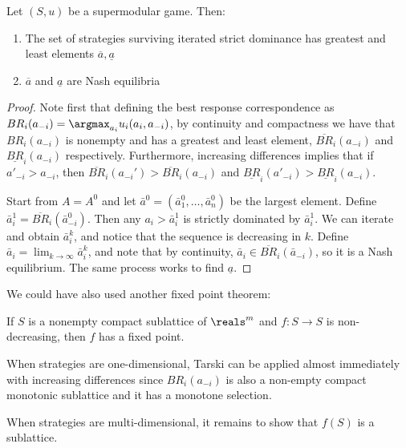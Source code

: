 \documentclass[10pt]{article}
\begin{document}
\begin{theorem}
	Let $(S,u)$ be a supermodular game. Then:\begin{enumerate}
		\item The set of strategies surviving iterated strict dominance has greatest and least elements $\overline{a},\underline{a}$
		\item $\overline{a}$ and $\underline{a}$ are Nash equilibria
	\end{enumerate}
\end{theorem}
\begin{proof}
	Note first that defining the best response correspondence as $BR_i(a_{-i}) = \argmax_{a_i}u_i(a_i,a_{-i})$, by continuity and compactness we have that $BR_i(a_{-i})$ is nonempty and has a greatest and least element, $\overline{BR}_i(a_{-i})$ and $\underline{BR}_i(a_{-i})$ respectively. Furthermore, increasing differences implies that if $a'_{-i} > a_{-i}$, then $\overline{BR}_i(a_{-i}') > \overline{BR}_i(a_{-i})$ and $\underline{BR}_i(a'_{-i}) > \underline{BR}_i(a_{-i})$.
	
	Start from $A = A^0$ and let $\bar{a}^0 = (\bar{a}^0_1,\dots,\bar{a}^0_n)$ be the largest element. Define $\bar{a}^1_i = \overline{BR}_i(\bar{a}^0_{-i})$. Then any $a_i > \bar{a}^1_i$ is strictly dominated by $\bar{a}^1_i$. We can iterate and obtain $\bar{a}^k_i$, and notice that the sequence is decreasing in $k$. Define $\bar{a}_i = \lim_{k\to\infty} \bar{a}^k_i$, and note that by continuity, $\bar{a}_i \in \overline{BR}_i(\bar{a}_{-i})$, so it is a Nash equilibrium. The same process works to find $\underline{a}$.
\end{proof}

We could have also used another fixed point theorem:

\begin{theorem}
	 If $S$ is a nonempty compact sublattice of $\reals^m$ and $f: S \to S$ is non-decreasing, then $f$ has a fixed point.
\end{theorem}

\begin{remark}
	When strategies are one-dimensional, Tarski can be applied almost immediately with increasing differences since $BR_i(a_{-i})$ is also a non-empty compact monotonic sublattice and it has a monotone selection.
	
	When strategies are multi-dimensional, it remains to show that $f(S)$ is a sublattice.
\end{remark}
\end{document}
